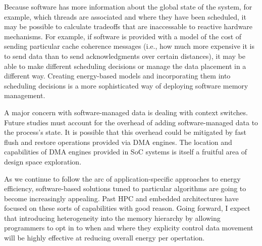 Because software has more information about the global state of the system, for example, which threads are associated
and where they have been scheduled, it may be possible to calculate tradeoffs that are inaccessable to reactive hardware mechanisms.
For example, if software is provided with a model of the cost of sending particular cache coherence messages (i.e., how much more expensive it is to send data than to send acknowledgments over certain distances), it may be able to make different scheduling decisions
or manage the data placement in a different way.
Creating energy-based models and incorporating them into scheduling decisions is a more sophisticated way
of deploying software memory management.

A major concern with software-managed data is dealing with context switches.
Future studies must account for the overhead of adding software-managed data to the process's state.
It is possible that this overhead could be mitigated by fast flush and restore operations provided via DMA engines.
The location and capabilities of DMA engines provided in SoC systems is itself a fruitful area of design space exploration.

As we continue to follow the arc of application-specific approaches to energy efficiency,
software-based solutions tuned to particular algorithms are going to become increasingly appealing.
Past HPC and embedded architectures have focused on these sorts of capabilities with good reason.
Going forward, I expect that
introducing heterogeneity into the memory hierarchy by allowing programmers to opt in to
when and where they explicity control data movement will be highly effective at
reducing overall energy per opertation.
